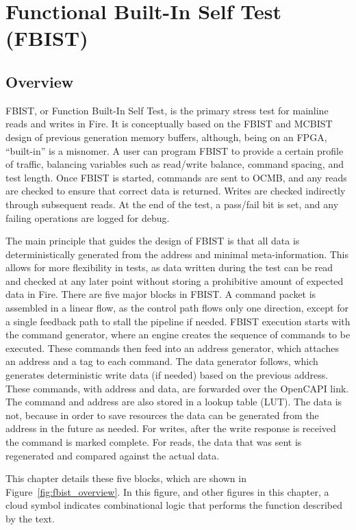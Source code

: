 \graphicspath{ {images/} }

\section{Functional Built-In Self Test (FBIST)} \label{section_fbist}

\subsection{Overview}
FBIST, or Function Built-In Self Test, is the primary stress test for
mainline reads and writes in Fire. It is conceptually based on the
FBIST and MCBIST design of previous generation memory buffers,
although, being on an FPGA, ``built-in'' is a misnomer. A user can
program FBIST to provide a certain profile of traffic, balancing
variables such as read/write balance, command spacing, and test
length. Once FBIST is started, commands are sent to OCMB, and any
reads are checked to ensure that correct data is returned. Writes are
checked indirectly through subsequent reads. At the end of the test, a
pass/fail bit is set, and any failing operations are logged for debug.

The main principle that guides the design of FBIST is that all data is
deterministically generated from the address and minimal
meta-information. This allows for more flexibility in tests, as data
written during the test can be read and checked at any later point
without storing a prohibitive amount of expected data in Fire. There
are five major blocks in FBIST. A command packet is assembled in a
linear flow, as the control path flows only one direction, except for
a single feedback path to stall the pipeline if needed. FBIST
execution starts with the command generator, where an engine creates
the sequence of commands to be executed. These commands then feed into
an address generator, which attaches an address and a tag to each
command. The data generator follows, which generates deterministic
write data (if needed) based on the previous address. These commands,
with address and data, are forwarded over the OpenCAPI link. The
command and address are also stored in a lookup table (LUT). The data
is not, because in order to save resources the data can be generated
from the address in the future as needed. For writes, after the write
response is received the command is marked complete. For reads, the
data that was sent is regenerated and compared against the actual
data.

This chapter details these five blocks, which are shown in
Figure~\ref{fig:fbist_overview}. In this figure, and other figures in
this chapter, a cloud symbol indicates combinational logic that
performs the function described by the text.


